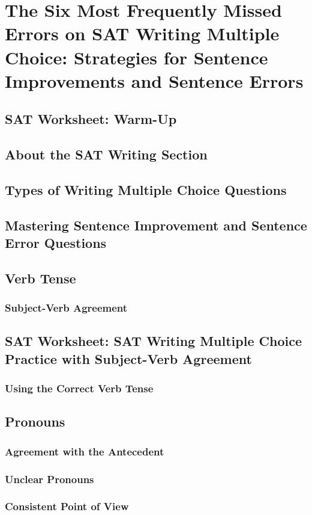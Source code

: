 \chapter{The Six Most Frequently Missed Errors on SAT Writing Multiple Choice: Strategies for Sentence Improvements and Sentence Errors}

\section{SAT Worksheet: Warm-Up}
\section{About the SAT Writing Section}
\section{Types of Writing Multiple Choice Questions}
\section{Mastering Sentence Improvement and Sentence Error Questions}
\section{Verb Tense}
\subsection{Subject-Verb Agreement}
\section{SAT Worksheet: SAT Writing Multiple Choice Practice with Subject-Verb Agreement}
\subsection{Using the Correct Verb Tense}
\section{Pronouns}
\subsection{Agreement with the Antecedent}
\subsection{Unclear Pronouns}
\subsection{Consistent Point of View}
